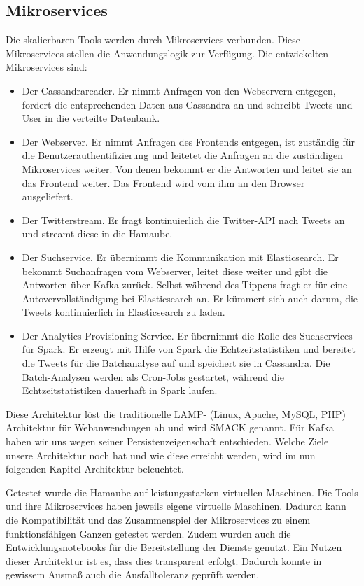 \subsection{Mikroservices}
Die skalierbaren Tools werden durch Mikroservices verbunden. Diese
Mikroservices stellen die Anwendungslogik zur Verfügung. Die
entwickelten Mikroservices sind:

\begin{itemize}
\item Der Cassandrareader. Er nimmt Anfragen von den Webservern
entgegen, fordert die entsprechenden Daten aus Cassandra an und
schreibt Tweets und User in die verteilte Datenbank.
\item Der Webserver. Er nimmt Anfragen des Frontends entgegen, ist
zuständig für die Benutzerauthentifizierung und leitetet die Anfragen
an die zuständigen Mikroservices weiter. Von denen bekommt er die
Antworten und leitet sie an das Frontend weiter. Das Frontend wird vom
ihm an den Browser ausgeliefert.
\item Der Twitterstream. Er fragt kontinuierlich die Twitter-API nach
Tweets an und streamt diese in die Hamaube.
\item Der Suchservice. Er übernimmt die Kommunikation mit Elasticsearch.
Er bekommt Suchanfragen vom Webserver, leitet diese weiter und gibt die
Antworten über Kafka zurück. Selbst während des Tippens fragt er für
eine Autovervollständigung bei Elasticsearch an. Er kümmert sich auch
darum, die Tweets kontinuierlich in Elasticsearch zu laden. 
\item Der Analytics-Provisioning-Service. Er übernimmt die Rolle des
Suchservices für Spark. Er erzeugt mit Hilfe von Spark die
Echtzeitstatistiken und bereitet die Tweets für die Batchanalyse auf
und speichert sie in Cassandra. Die Batch-Analysen werden als Cron-Jobs
gestartet, während die Echtzeitstatistiken dauerhaft in Spark laufen.
\end{itemize}
Diese Architektur löst die traditionelle LAMP- (Linux, Apache, MySQL,
PHP) Architektur für Webanwendungen ab und wird SMACK genannt. Für
Kafka haben wir uns wegen seiner Persistenzeigenschaft entschieden.
Welche Ziele unsere Architektur noch hat und wie diese erreicht werden,
wird im nun folgenden Kapitel Architektur beleuchtet.

Getestet wurde die Hamaube auf leistungsstarken virtuellen Maschinen.
Die Tools und ihre Mikroservices haben jeweils eigene virtuelle
Maschinen. Dadurch kann die Kompatibilität und das Zusammenspiel der
Mikroservices zu einem funktionsfähigen Ganzen getestet werden. Zudem
wurden auch die Entwicklungsnotebooks für die Bereitstellung der
Dienste genutzt. Ein Nutzen dieser Architektur ist es, dass dies
transparent erfolgt. Dadurch konnte in gewissem Ausmaß auch die
Ausfalltoleranz geprüft werden.
